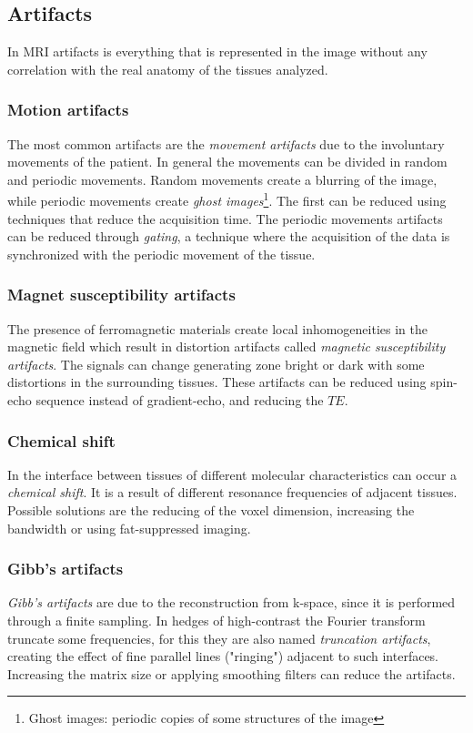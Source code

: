 \begin{figure}[h]
    \centering
    \caption{}
    \label{fig:gradXY}
 \end{figure}

 \subsection{Artifacts}
 In MRI artifacts is everything that is represented in the image without any correlation with the real anatomy of the tissues analyzed.
  \subsubsection*{Motion artifacts}
  The most common artifacts are the \emph{movement artifacts} due to the involuntary movements of the patient. In general the movements can be divided in random and periodic movements. Random movements create a blurring of the image, while periodic movements create \emph{ghost images}\footnote{Ghost images: periodic copies of some structures of the image}. The first can be reduced using techniques that reduce the acquisition time. The periodic movements artifacts can be reduced through \emph{gating}, a technique where the acquisition of the data is synchronized with the periodic movement of the tissue.
  \subsubsection*{Magnet susceptibility artifacts}
  The presence of ferromagnetic materials create local inhomogeneities in the magnetic field which result in distortion artifacts called \emph{magnetic susceptibility artifacts}. The signals can change generating zone bright or dark with some distortions in the surrounding tissues. These artifacts can be reduced using spin-echo sequence instead of gradient-echo, and reducing the $TE$.
  \subsubsection*{Chemical shift}
  In the interface between tissues of different molecular characteristics can occur a \emph{chemical shift}. It is a result of different resonance frequencies of adjacent tissues. Possible solutions are the reducing of the voxel dimension, increasing the bandwidth or using fat-suppressed imaging.
  \subsubsection*{Gibb's artifacts}
  \emph{Gibb's artifacts} are due to the reconstruction from k-space, since it is performed through a finite sampling. In hedges of high-contrast the Fourier transform truncate some frequencies, for this they are also named \emph{truncation artifacts}, creating the effect of fine parallel lines ("ringing") adjacent to such interfaces. Increasing the matrix size or applying smoothing filters can reduce the artifacts.
